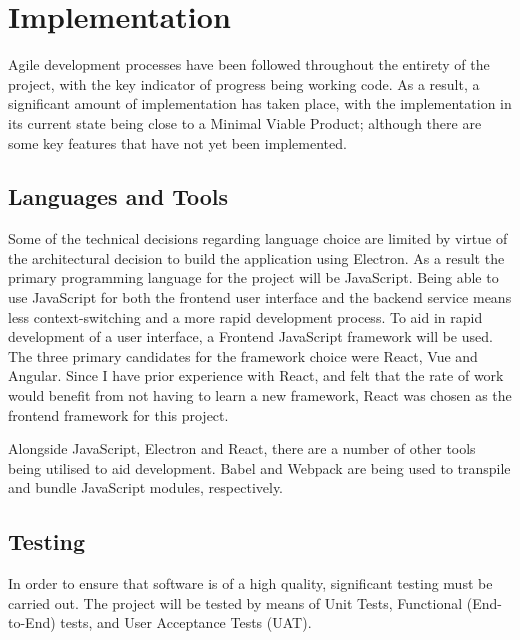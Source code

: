 \chapter{Implementation}


Agile development processes have been followed throughout the entirety of the project, with the key indicator of progress being working code. As a result, a significant amount of implementation has taken place, with the implementation in its current state being close to a Minimal Viable Product; although there are some key features that have not yet been implemented.

\section{Languages and Tools}

Some of the technical decisions regarding language choice are limited by virtue of the architectural decision to build the application using Electron. As a result the primary programming language for the project will be JavaScript. Being able to use JavaScript for both the frontend user interface and the backend service means less context-switching and a more rapid development process. To aid in rapid development of a user interface, a Frontend JavaScript framework will be used. The three primary candidates for the framework choice were React, Vue and Angular. Since I have prior experience with React, and felt that the rate of work would benefit from not having to learn a new framework, React was chosen as the frontend framework for this project.

Alongside JavaScript, Electron and React, there are a number of other tools being utilised to aid development. Babel and Webpack are being used to transpile and bundle JavaScript modules, respectively. 

\section{Testing}

In order to ensure that software is of a high quality, significant testing must be carried out. The project will be tested by means of Unit Tests, Functional (End-to-End) tests, and User Acceptance Tests (UAT).

